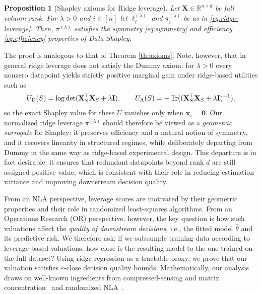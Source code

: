 \documentclass{article}
\newtheorem{proposition}[theorem]{Proposition}
\def\xmat{\mathbf{X}}
\def\imat{\mathbf{I}}
\def\x{\mathbf{x}}
\newcommand{\1}{\mathbbm{1}}
\DeclareMathOperator{\Tr}{Tr}
\begin{document}
\begin{proposition}[Shapley axioms for Ridge leverage]
\label{prop:ridge-shapley}
    Let $\xmat\in\mathbb{R}^{n\times d}$ be full column rank. For $\lambda>0$ and $i\in[n]$ let $\ell_i^{(\lambda)}$ and $\pi_i^{(\lambda)}$ be as in \eqref{eq:ridge-leverage}.
    Then, $\pi^{(\lambda)}$ satisfies the symmetry \eqref{eq:symmetry} and efficiency \eqref{eq:efficiency} properties of Data Shapley.
\end{proposition}

The proof is analogous to that of Theorem \ref{th:axioms}.
%
Note, however, that in general ridge leverage does not satisfy the Dummy axiom: for $\lambda>0$ every nonzero datapoint yields strictly positive marginal gain under ridge-based utilities such as
\[
U_{\rm D}(S)=\log\det(\xmat_S^\top \xmat_S+\lambda \imat),
\qquad
U_{\rm A}(S)=-\Tr((\xmat_S^\top \xmat_S+\lambda \imat)^{-1}),
\]
so the exact Shapley value for these $U$ vanishes only when $\x_i=\mathbf{0}$.
%
Our normalized ridge leverage $\pi^{(\lambda)}$ should therefore be viewed as a \emph{geometric surrogate} for Shapley: it preserves efficiency and a natural notion of symmetry, and it recovers linearity in structured regimes, while deliberately departing from Dummy in the same way as ridge-based experimental design.
%
This departure is in fact desirable: it ensures that redundant datapoints beyond rank $d$ are still assigned positive value, which is consistent with their role in reducing estimation variance and improving downstream decision quality.

From an NLA perspective, leverage scores are motivated by their geometric properties and their role in randomized least-squares algorithms.
%
From an Operations Research (OR) perspective, however, the key question is how such valuations affect the \emph{quality of downstream decisions}, i.e., the fitted model $\hat\theta$ and its predictive risk.
%
We therefore ask: if we subsample training data according to leverage-based valuations, how close is the resulting model to the one trained on the full dataset?
%
Using ridge regression as a tractable proxy, we prove that our valuation satisfies $\varepsilon$-close decision quality bounds.
%
Mathematically, our analysis draws on well-known ingredients from compressed-sensing and matrix concentration~\cite{tropp2012user, tao2012topics, candes2005decoding} and randomized NLA~\cite{cohen2015ridge, musco2017recursive, drineas2012fast}.
%
\end{document}
